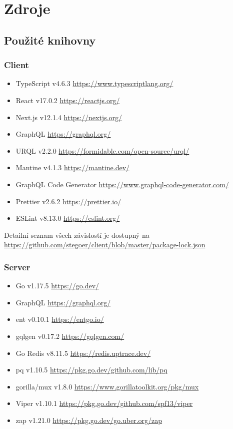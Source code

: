 
\section{Zdroje}\label{sec:zdroje}

\subsection{Použité knihovny}\label{subsec:pouzite-knihovny}

\subsubsection{Client}\label{subsubsec:client}
\begin{itemize}
    \item TypeScript v4.6.3 \url{https://www.typescriptlang.org/}
    \item React v17.0.2 \url{https://reactjs.org/}
    \item Next.js v12.1.4 \url{https://nextjs.org/}
    \item GraphQL \url{https://graphql.org/}
    \item URQL v2.2.0 \url{https://formidable.com/open-source/urql/}
    \item Mantine v4.1.3 \url{https://mantine.dev/}
    \item GraphQL Code Generator \url{https://www.graphql-code-generator.com/}
    \item Prettier v2.6.2 \url{https://prettier.io/}
    \item ESLint v8.13.0 \url{https://eslint.org/}
\end{itemize}

Detailní seznam všech závislostí je dostupný na
\url{https://github.com/stegoer/client/blob/master/package-lock.json}

\subsubsection{Server}\label{subsubsec:server}
\begin{itemize}
    \item Go v1.17.5 \url{https://go.dev/}
    \item GraphQL \url{https://graphql.org/}
    \item ent v0.10.1 \url{https://entgo.io/}
    \item gqlgen v0.17.2 \url{https://gqlgen.com/}
    \item Go Redis v8.11.5 \url{https://redis.uptrace.dev/}
    \item pq v1.10.5 \url{https://pkg.go.dev/github.com/lib/pq}
    \item gorilla/mux v1.8.0 \url{https://www.gorillatoolkit.org/pkg/mux}
    \item Viper v1.10.1 \url{https://pkg.go.dev/github.com/spf13/viper}
    \item zap v1.21.0 \url{https://pkg.go.dev/go.uber.org/zap}
\end{itemize}

